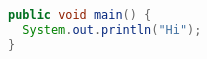 \begin{lstlisting}[language=java]
public void main() {
  System.out.println("Hi");
}
\end{lstlisting}
